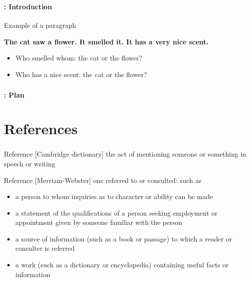 \documentclass[xcolor=table]{beamer}
\subtitle[09- Coreference resolution]{Chapter 09\\Coreference resolution}
\begin{document}
	
\begin{frame}
	\frametitle{\inserttitle}
	\framesubtitle{\insertshortsubtitle: Introduction}

	\begin{exampleblock}{Example of a paragraph}
		\begin{center}
			\Large\bfseries
		The cat saw a flower. \textbf{\color{red}It} smelled \textbf{\color{red}it}. \textbf{\color{red}It} has a very nice scent.
		\end{center}
	\end{exampleblock}
	
	\begin{itemize}
		\item Who smelled whom: the cat or the flower?
		\item Who has a nice scent: the cat or the flower?
	\end{itemize}

\end{frame}


\begin{frame}
	\frametitle{\inserttitle}
	\framesubtitle{\insertshortsubtitle: Plan}

	\begin{multicols}{2}
	\tableofcontents
	\end{multicols}

\end{frame}

\section{References}

\begin{frame}
	\frametitle{\insertshortsubtitle}
	\framesubtitle{\insertsection}
	
	\begin{block}{Reference [Cambridge dictionary]}
		the act of mentioning someone or something in speech or writing
	\end{block}
	
	\begin{block}{Reference [Merriam-Webster]}
		one referred to or consulted: such as
		\begin{itemize}
			\item  a person to whom inquiries as to character or ability can be made
			\item a statement of the qualifications of a person seeking employment or appointment given by someone familiar with the person
			\item a source of information (such as a book or passage) to which a reader or consulter is referred
			\item a work (such as a dictionary or encyclopedia) containing useful facts or information
		\end{itemize}
	\end{block}
	
\end{frame}
\end{document}
